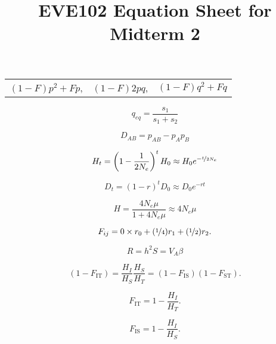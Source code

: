 \documentclass[12pt,twocolumn]{article}
\newcommand{\fis}{F_{\mathrm{IS}}}
\newcommand{\fit}{F_{\mathrm{IT}}}
\newcommand{\fst}{F_{\mathrm{ST}}}
\begin{document}
\title{EVE102 Equation Sheet for Midterm 2}
\date{}
\maketitle

\begin{center}
\begin{tabular}{ccc}
$(1-F) p^2 + F p$, & $(1-F) 2pq$, & $(1-F) q^2 + F q$ \nonumber
\end{tabular}
\end{center}

\begin{equation}
q_{eq} = \frac{s_1}{s_1+s_2}
\end{equation}

\begin{equation}
D_{AB} = p_{AB} - p_Ap_B \nonumber
\end{equation}

\begin{equation}
  H_t = \left(1-\frac{1}{2N_e} \right)^tH_0 \approx H_0 e^{-\nicefrac{t}{2N_e}} \nonumber
\end{equation}

\begin{equation}
  D_t=  (1-r)^t D_0 \approx D_0 e^{-rt} \nonumber
\end{equation}

\begin{equation}
  H = \frac{4N_e\mu}{1+4N_e\mu} \approx 4N_e\mu  \nonumber
\end{equation}

\begin{equation}
  F_{ij}= 0 \times r_0 + (\nicefrac{1}{4}) r_1  + (\nicefrac{1}{2}) r_2.  \nonumber
\label{eqn:coeffkinship}
\end{equation}

\begin{equation}
R = h^2 S = V_A \beta
\end{equation}


\begin{equation}
(1-\fit) =\frac{H_I}{H_S} \frac{H_S}{H_T}=(1-\fis)(1-\fst).\nonumber
\label{eqn:F_relationships}
\end{equation}

\begin{equation}
\fit =1-\frac{H_I}{H_T}.\nonumber
\end{equation}

\begin{equation}
\fis =1-\frac{H_I}{H_S}.\nonumber
\end{equation}
\end{document}
